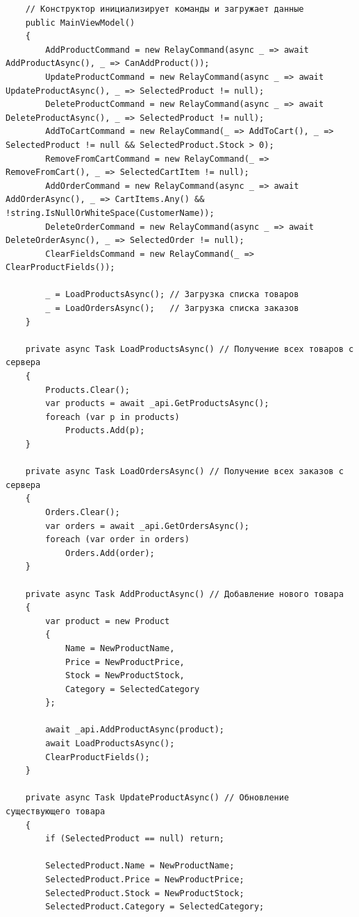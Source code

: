 \documentclass[12pt]{article}
\newenvironment{code}
  {\par\captionsetup{type=listing}\noindent}
  {\par\vspace{\baselineskip}}
\numberwithin{listing}{section}
\numberwithin{figure}{section}
\begin{document}
\begin{code}
\begin{verbatim}
    // Конструктор инициализирует команды и загружает данные
    public MainViewModel()
    {
        AddProductCommand = new RelayCommand(async _ => await AddProductAsync(), _ => CanAddProduct());
        UpdateProductCommand = new RelayCommand(async _ => await UpdateProductAsync(), _ => SelectedProduct != null);
        DeleteProductCommand = new RelayCommand(async _ => await DeleteProductAsync(), _ => SelectedProduct != null);
        AddToCartCommand = new RelayCommand(_ => AddToCart(), _ => SelectedProduct != null && SelectedProduct.Stock > 0);
        RemoveFromCartCommand = new RelayCommand(_ => RemoveFromCart(), _ => SelectedCartItem != null);
        AddOrderCommand = new RelayCommand(async _ => await AddOrderAsync(), _ => CartItems.Any() && !string.IsNullOrWhiteSpace(CustomerName));
        DeleteOrderCommand = new RelayCommand(async _ => await DeleteOrderAsync(), _ => SelectedOrder != null);
        ClearFieldsCommand = new RelayCommand(_ => ClearProductFields());

        _ = LoadProductsAsync(); // Загрузка списка товаров
        _ = LoadOrdersAsync();   // Загрузка списка заказов
    }

    private async Task LoadProductsAsync() // Получение всех товаров с сервера
    {
        Products.Clear();
        var products = await _api.GetProductsAsync();
        foreach (var p in products)
            Products.Add(p);
    }

    private async Task LoadOrdersAsync() // Получение всех заказов с сервера
    {
        Orders.Clear();
        var orders = await _api.GetOrdersAsync();
        foreach (var order in orders)
            Orders.Add(order);
    }

    private async Task AddProductAsync() // Добавление нового товара
    {
        var product = new Product
        {
            Name = NewProductName,
            Price = NewProductPrice,
            Stock = NewProductStock,
            Category = SelectedCategory
        };

        await _api.AddProductAsync(product);
        await LoadProductsAsync();
        ClearProductFields();
    }

    private async Task UpdateProductAsync() // Обновление существующего товара
    {
        if (SelectedProduct == null) return;

        SelectedProduct.Name = NewProductName;
        SelectedProduct.Price = NewProductPrice;
        SelectedProduct.Stock = NewProductStock;
        SelectedProduct.Category = SelectedCategory;


\end{verbatim}
\end{code}
\end{document}
